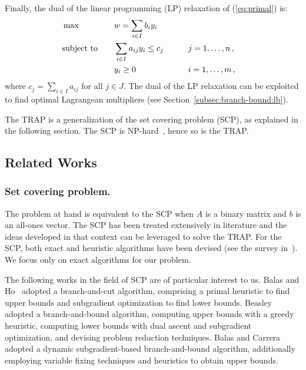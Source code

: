 \documentclass[runningheads]{llncs}
\begin{document}
Finally, the dual of the linear programming (LP) relaxation of (\ref{eq:primal}) is:
\begin{alignat}{3}
  &\max & \quad & w = \sum_{i \in I} b_i y_i \label{eq:dual}\\
  &\text{subject to}  &       & \sum_{i \in I} a_{ij} y_i \le c_j & \qquad & j = 1,\dots,n \, , \notag\\
  &                   &       & y_i \ge 0  &\qquad& i = 1,\dots,m \, , \notag
\end{alignat}
where $c_j = \sum_{i \in I} a_{ij}$ for all $j \in J$. The dual of the LP relaxation can be exploited to find optimal Lagrangean multipliers (see Section~\ref{subsec:branch-bound:lb}).

The TRAP is a generalization of the set covering problem (SCP), as explained in the following section. The SCP is NP-hard~\cite{caprara-2000-algorithms}, hence so is the TRAP.

\subsection{Related Works}
\label{subsec:problem:related_works}

\subsubsection{Set covering problem.} The problem at hand is equivalent to the SCP when $A$ is a binary matrix and $b$ is an all-ones vector. The SCP has been treated extensively in literature and the ideas developed in that context can be leveraged to solve the TRAP. For the SCP, both exact and heuristic algorithms have been devised (see the survey in~\cite{caprara-2000-algorithms}). We focus only on exact algorithms for our problem. 


The following works in the field of SCP are of particular interest to us. Balas and Ho~\cite{balas-ho-2009-set-covering} adopted a branch-and-cut algorithm, comprising a primal heuristic to find upper bounds and subgradient optimization to find lower bounds.
Beasley~\cite{beasley-1987-algorithm} adopted a branch-and-bound algorithm, computing upper bounds with a greedy heuristic, computing lower bounds with dual ascent and subgradient optimization, and devising problem reduction techniques.
Balas and Carrera~\cite{balas-carrera-1996-dynamic} adopted a dynamic subgradient-based branch-and-bound algorithm, additionally employing variable fixing techniques and heuristics to obtain upper bounds.
\end{document}
